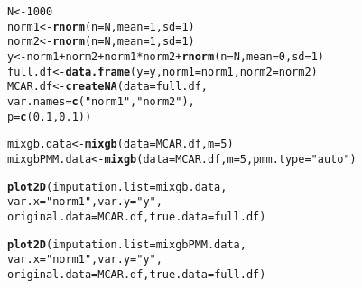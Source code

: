 \documentclass{article}\usepackage[]{graphicx}\usepackage[]{xcolor}
\makeatletter
\newcommand{\hlnum}[1]{\textcolor[rgb]{0.686,0.059,0.569}{#1}}%
\newcommand{\hlstr}[1]{\textcolor[rgb]{0.192,0.494,0.8}{#1}}%
\newcommand{\hlopt}[1]{\textcolor[rgb]{0,0,0}{#1}}%
\newcommand{\hlstd}[1]{\textcolor[rgb]{0.345,0.345,0.345}{#1}}%
\newcommand{\hlkwb}[1]{\textcolor[rgb]{0.69,0.353,0.396}{#1}}%
\newcommand{\hlkwc}[1]{\textcolor[rgb]{0.333,0.667,0.333}{#1}}%
\newcommand{\hlkwd}[1]{\textcolor[rgb]{0.737,0.353,0.396}{\textbf{#1}}}%
\newenvironment{kframe}{%
 \def\at@end@of@kframe{}%
 \ifinner\ifhmode%
  \def\at@end@of@kframe{\end{minipage}}%
  \begin{minipage}{\columnwidth}%
 \fi\fi%
 \def\FrameCommand##1{\hskip\@totalleftmargin \hskip-\fboxsep
 \colorbox{shadecolor}{##1}\hskip-\fboxsep
     \hskip-\linewidth \hskip-\@totalleftmargin \hskip\columnwidth}%
 \MakeFramed {\advance\hsize-\width
   \@totalleftmargin\z@ \linewidth\hsize
   \@setminipage}}%
 {\par\unskip\endMakeFramed%
 \at@end@of@kframe}
\newenvironment{knitrout}{}{} %
\makeatother
\begin{document}
\begin{knitrout}
\color{fgcolor}\begin{kframe}
\begin{alltt}
\hlstd{N} \hlkwb{<-} \hlnum{1000}
\hlstd{norm1} \hlkwb{<-} \hlkwd{rnorm}\hlstd{(}\hlkwc{n} \hlstd{= N,} \hlkwc{mean} \hlstd{=} \hlnum{1}\hlstd{,} \hlkwc{sd} \hlstd{=} \hlnum{1}\hlstd{)}
\hlstd{norm2} \hlkwb{<-} \hlkwd{rnorm}\hlstd{(}\hlkwc{n} \hlstd{= N,} \hlkwc{mean} \hlstd{=} \hlnum{1}\hlstd{,} \hlkwc{sd} \hlstd{=} \hlnum{1}\hlstd{)}
\hlstd{y} \hlkwb{<-} \hlstd{norm1} \hlopt{+} \hlstd{norm2} \hlopt{+} \hlstd{norm1} \hlopt{*} \hlstd{norm2} \hlopt{+} \hlkwd{rnorm}\hlstd{(}\hlkwc{n} \hlstd{= N,} \hlkwc{mean} \hlstd{=} \hlnum{0}\hlstd{,} \hlkwc{sd} \hlstd{=} \hlnum{1}\hlstd{)}
\hlstd{full.df} \hlkwb{<-} \hlkwd{data.frame}\hlstd{(}\hlkwc{y} \hlstd{= y,} \hlkwc{norm1} \hlstd{= norm1,} \hlkwc{norm2} \hlstd{= norm2)}
\hlstd{MCAR.df} \hlkwb{<-} \hlkwd{createNA}\hlstd{(}\hlkwc{data} \hlstd{= full.df,}
                    \hlkwc{var.names} \hlstd{=} \hlkwd{c}\hlstd{(}\hlstr{"norm1"}\hlstd{,} \hlstr{"norm2"}\hlstd{),}
                    \hlkwc{p} \hlstd{=} \hlkwd{c}\hlstd{(}\hlnum{0.1}\hlstd{,} \hlnum{0.1}\hlstd{))}
\end{alltt}
\end{kframe}
\end{knitrout}


\begin{knitrout}
\color{fgcolor}\begin{kframe}
\begin{alltt}
\hlstd{mixgb.data} \hlkwb{<-} \hlkwd{mixgb}\hlstd{(}\hlkwc{data} \hlstd{= MCAR.df,} \hlkwc{m} \hlstd{=} \hlnum{5}\hlstd{)}
\hlstd{mixgbPMM.data} \hlkwb{<-} \hlkwd{mixgb}\hlstd{(}\hlkwc{data} \hlstd{= MCAR.df,} \hlkwc{m} \hlstd{=} \hlnum{5}\hlstd{,} \hlkwc{pmm.type} \hlstd{=} \hlstr{"auto"}\hlstd{)}
\end{alltt}
\end{kframe}
\end{knitrout}




\begin{knitrout}
\color{fgcolor}\begin{kframe}
\begin{alltt}
\hlkwd{plot2D}\hlstd{(}\hlkwc{imputation.list} \hlstd{= mixgb.data,}
          \hlkwc{var.x} \hlstd{=} \hlstr{"norm1"}\hlstd{,} \hlkwc{var.y} \hlstd{=} \hlstr{"y"}\hlstd{,}
          \hlkwc{original.data} \hlstd{= MCAR.df,} \hlkwc{true.data} \hlstd{= full.df)}

\hlkwd{plot2D}\hlstd{(}\hlkwc{imputation.list} \hlstd{= mixgbPMM.data,}
          \hlkwc{var.x} \hlstd{=} \hlstr{"norm1"}\hlstd{,} \hlkwc{var.y} \hlstd{=} \hlstr{"y"}\hlstd{,}
          \hlkwc{original.data} \hlstd{= MCAR.df,} \hlkwc{true.data} \hlstd{= full.df)}
\end{alltt}
\end{kframe}
\end{knitrout}
\end{document}
